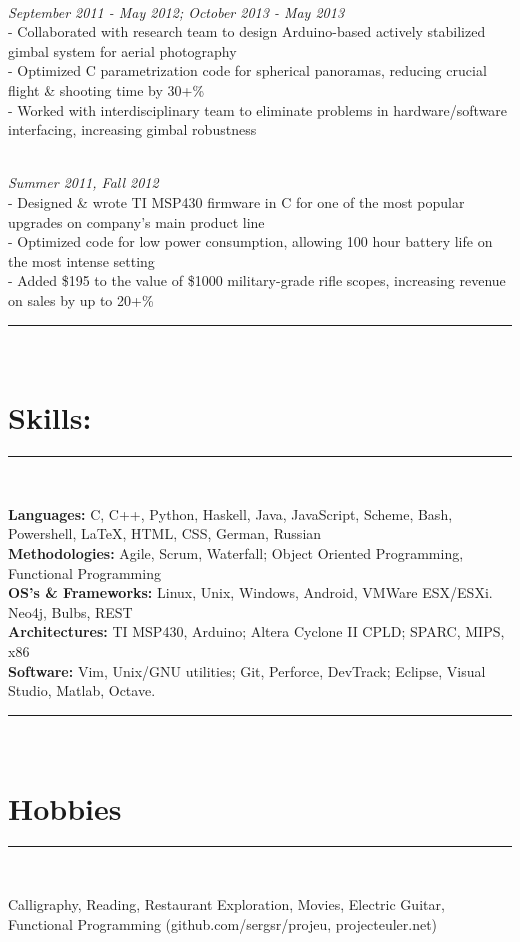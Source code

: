 \documentclass{article}
\newcommand{\sline}{\noindent\rule{575pt}{0.5pt}}
\begin{document}
\begin{spacing}{1.0}
 \\
\hfill {\sl September 2011 - May 2012; October 2013 - May 2013} \\
\indent \indent - Collaborated with research team to design Arduino-based
                  actively stabilized gimbal system for aerial photography\\
\indent \indent - Optimized C parametrization code for spherical panoramas,
                  reducing crucial flight \& shooting time by 30+\% \\
\indent \indent - Worked with interdisciplinary team to eliminate problems in
                  hardware/software interfacing, increasing gimbal robustness
\end{spacing}

\begin{spacing}{1.0}
 \\
\hfill {\sl Summer 2011, Fall 2012} \\
\indent \indent - Designed \& wrote TI MSP430 firmware in C for one of the most
                  popular upgrades on company's main product line \\
\indent \indent - Optimized code for low power consumption, allowing 100 hour
                  battery life on the most intense setting\\
\indent \indent - Added \$195 to the value of \$1000 military-grade rifle
                  scopes, increasing revenue on sales by up to 20+\%
\end{spacing}

\sline \\
\section*{Skills:}
\sline \\
\begin{spacing}{1.0}
\noindent\textbf{Languages:}
C, C++, Python, Haskell, Java, JavaScript, Scheme, Bash, Powershell, \LaTeX,
HTML, CSS, German, Russian\\
\textbf{Methodologies:}
Agile, Scrum, Waterfall; Object Oriented Programming, Functional Programming \\
\textbf{OS's \& Frameworks:}
Linux, Unix, Windows, Android, VMWare ESX/ESXi. Neo4j, Bulbs, REST\\
\textbf{Architectures:}
TI MSP430, Arduino; Altera
Cyclone II CPLD; SPARC, MIPS, x86 \\
\textbf{Software:}
Vim, Unix/GNU utilities; Git, Perforce, DevTrack; Eclipse, Visual Studio,
Matlab, Octave.
\end{spacing}

\sline \\
\section*{Hobbies}
\sline \\
\begin{spacing}{1.0}
\indent Calligraphy, Reading, Restaurant Exploration, Movies, Electric Guitar,
Functional Programming (github.com/sergsr/projeu, \indent projecteuler.net)
\end{spacing}
\end{document}
